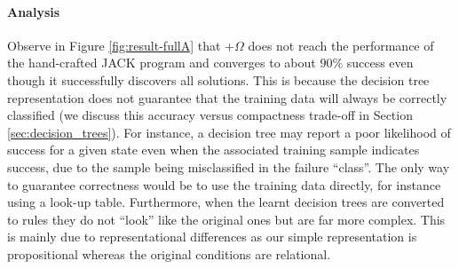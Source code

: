 \paragraph{Analysis} Observe in Figure \ref{fig:result-fullA} that \CL+$\Omega$ does not reach the performance of the hand-crafted JACK program and converges to about $90\%$ success even though it successfully discovers all solutions.
This is because the decision tree representation does not guarantee that the training data will always be correctly classified (we discuss this accuracy versus compactness trade-off in Section \ref{sec:decision_trees}). For instance, a decision tree may report a poor likelihood of success for a given state even when the associated training sample indicates success, due to the sample being misclassified in the failure ``class''. The only way to guarantee correctness would be to use the training data directly, for instance using a look-up table. Furthermore, when the learnt decision trees are converted to rules they do not ``look'' like the original ones but are far more complex. This is mainly due to representational differences as our simple representation is propositional whereas the original conditions are relational.
